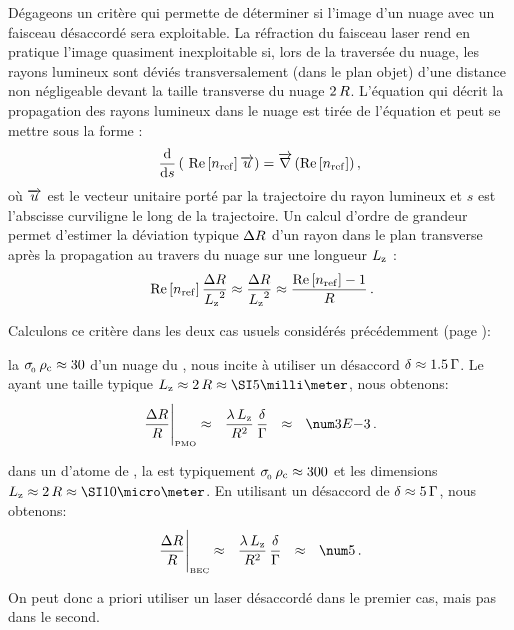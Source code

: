 Dégageons un critère qui permette de déterminer si l'image d'un nuage avec un faisceau désaccordé sera exploitable.
\newline
\noindent La réfraction du faisceau laser rend en pratique l'image quasiment inexploitable si, lors de la traversée du nuage, les rayons lumineux sont déviés transversalement (dans le plan objet) d'une distance non négligeable devant la taille transverse du nuage $2\,{R}$.
%
L'équation qui décrit la propagation des rayons lumineux dans le nuage est tirée de l'équation  et peut se mettre sous la forme :
\[
{
{\frac{\mathrm{d} }{\mathrm{d} s}}\left(~{{\mathop{\mathrm{Re}}\left[{n_{\rm ref}}\right]}}\,\overrightarrow{u} \right)}
 = 
{\overrightarrow{\nabla} \left( {{\mathop{\mathrm{Re}}\left[{n_{\rm ref}}\right]}} \right)}
\, ,
\]
où $\overrightarrow{u}$ est le vecteur unitaire porté par la trajectoire du rayon lumineux et $s$ est l'abscisse curviligne le long de la trajectoire.
Un calcul d'ordre de grandeur permet d'estimer la déviation typique ${\Delta R}$ d'un rayon dans le plan transverse après la propagation au travers du nuage sur une longueur ${L_{\rm z}}$ :
\[
{
~{{\mathop{\mathrm{Re}}\left[{n_{\rm ref}}\right]}}\,\frac{{\Delta R}}{{L_{\rm z}}^2} \approx \frac{{\Delta R}}{{L_{\rm z}}^2} }
 \approx 
 {\frac{{{\mathop{\mathrm{Re}}\left[{n_{\rm ref}}\right]}}-1}{{R}}}
 \, .
\]%
%
\ApplicationNumerique
{
Calculons ce critère dans les deux cas usuels considérés précédemment (page \pageref{an:ProfondeurOptiques}):
\begin{ditemize}
	\item la \pro ${{\sigma_{_{\hspace{-1pt}{0}}}}\,{{\rho_{\rm{c}}}}} \approx 30$ d'un nuage du \pmo, nous incite à utiliser un désaccord ${\delta} \approx 1.5\,{\Gamma}$. Le \n ayant une taille typique \mbox{$\LZnuage\approx2\,\Rnuage\approx\mm{5}$}, nous obtenons:
\[
\AvecTexte{\frac{\deviR}{\Rnuage}}{\tiny PMO} \approx ~~ \frac{\lambda\,\LZnuage}{\Rnuage^2} 
\, \frac{\desac}{\pulsSpont} 
~~ \approx ~~ \val{3E{-3}}
\pointformule
\]
\item dans un \bec d'atome de \Rb, la \pro est typiquement ${{\sigma_{_{\hspace{-1pt}{0}}}}\,{{\rho_{\rm{c}}}}} \approx 300$ et les dimensions \mbox{$\LZnuage\approx2\,\Rnuage\approx\micron{10}$}. En utilisant un désaccord de ${\delta} \approx 5\,{\Gamma}$, nous obtenons:
\[
\AvecTexte{\frac{\deviR}{\Rnuage}}{\tiny BEC} \approx ~~  \frac{\lambda\,\LZnuage}{\Rnuage^2} 
\, \frac{\desac}{\pulsSpont} 
~~ \approx ~~ \val{5}
\pointformule
\]
\end{ditemize}
On peut donc a priori utiliser un laser désaccordé dans le premier cas, mais pas dans le second.
}

